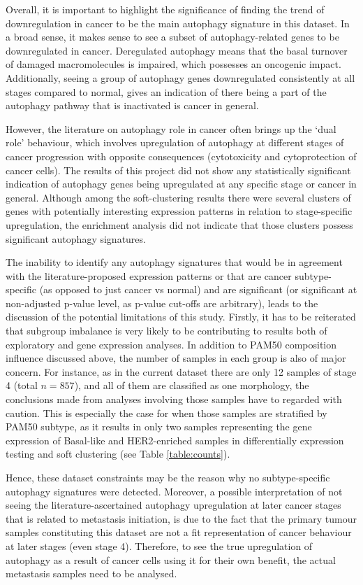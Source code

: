 Overall, it is important to highlight the significance of finding the trend of downregulation in cancer to be the main autophagy signature in this dataset. In a broad sense, it makes sense to see a subset of  autophagy-related genes to be downregulated in cancer. Deregulated autophagy means that the basal turnover of damaged macromolecules is impaired, which possesses an oncogenic impact. Additionally, seeing a group of autophagy genes downregulated consistently at all stages compared to normal, gives an indication of there being a part of the autophagy pathway that is inactivated is cancer in general. %

However, the literature on autophagy role in cancer often brings up the ‘dual role’ behaviour, which involves upregulation of  autophagy at different stages of cancer progression with opposite consequences (cytotoxicity and cytoprotection of cancer cells). The results of this project did not show any statistically significant indication of autophagy genes being upregulated at any specific stage or cancer in general. Although among the soft-clustering results there were several clusters of genes with potentially interesting expression patterns in relation to stage-specific upregulation,  the enrichment analysis did not indicate that those clusters possess significant autophagy signatures.

The inability to identify any autophagy signatures that would be in agreement with the literature-proposed expression patterns or that are cancer subtype-specific (as opposed to just cancer vs normal) and are significant (or significant at non-adjusted p-value level, as p-value cut-offs are arbitrary), leads to the discussion of the potential limitations of this study.
Firstly, it has to be reiterated that subgroup imbalance is very likely to be contributing to results both of exploratory and gene expression analyses. In addition to PAM50 composition influence discussed above, the number of samples in each  group is also of major concern. For instance, as in the current dataset there are only 12 samples of stage 4 (total $n=857$), and all of them are classified as one morphology, the conclusions made from analyses involving those samples have to regarded with caution. This is especially the case for when those samples are stratified by PAM50 subtype, as it results in only two samples representing the gene expression of Basal-like and HER2-enriched samples in differentially expression testing and soft clustering (see Table \ref{table:counts}). 

Hence, these dataset constraints may be the reason why no subtype-specific autophagy signatures were detected. Moreover, a possible interpretation of not seeing the literature-ascertained autophagy upregulation at later cancer stages that is related to metastasis initiation, is due to the fact that the primary tumour samples constituting this dataset are not a fit representation of cancer behaviour at later stages (even stage 4). Therefore, to see the true upregulation of autophagy as a result of cancer cells using it for their own benefit, the actual metastasis samples need to be analysed. 

